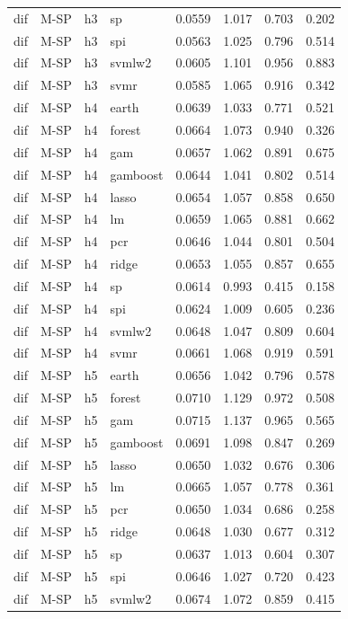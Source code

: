 \begin{ThreePartTable}
\begin{longtable}[t]{llclcccc}
dif & M-SP & h3 & sp & 0.0559 & 1.017 & 0.703 & 0.202\\
dif & M-SP & h3 & spi & 0.0563 & 1.025 & 0.796 & 0.514\\
dif & M-SP & h3 & svmlw2 & 0.0605 & 1.101 & 0.956 & 0.883\\
dif & M-SP & h3 & svmr & 0.0585 & 1.065 & 0.916 & 0.342\\
\addlinespace
dif & M-SP & h4 & earth & 0.0639 & 1.033 & 0.771 & 0.521\\
dif & M-SP & h4 & forest & 0.0664 & 1.073 & 0.940 & 0.326\\
dif & M-SP & h4 & gam & 0.0657 & 1.062 & 0.891 & 0.675\\
dif & M-SP & h4 & gamboost & 0.0644 & 1.041 & 0.802 & 0.514\\
dif & M-SP & h4 & lasso & 0.0654 & 1.057 & 0.858 & 0.650\\
dif & M-SP & h4 & lm & 0.0659 & 1.065 & 0.881 & 0.662\\
dif & M-SP & h4 & pcr & 0.0646 & 1.044 & 0.801 & 0.504\\
dif & M-SP & h4 & ridge & 0.0653 & 1.055 & 0.857 & 0.655\\
dif & M-SP & h4 & sp & 0.0614 & 0.993 & 0.415 & 0.158\\
dif & M-SP & h4 & spi & 0.0624 & 1.009 & 0.605 & 0.236\\
dif & M-SP & h4 & svmlw2 & 0.0648 & 1.047 & 0.809 & 0.604\\
dif & M-SP & h4 & svmr & 0.0661 & 1.068 & 0.919 & 0.591\\
\addlinespace
dif & M-SP & h5 & earth & 0.0656 & 1.042 & 0.796 & 0.578\\
dif & M-SP & h5 & forest & 0.0710 & 1.129 & 0.972 & 0.508\\
dif & M-SP & h5 & gam & 0.0715 & 1.137 & 0.965 & 0.565\\
dif & M-SP & h5 & gamboost & 0.0691 & 1.098 & 0.847 & 0.269\\
dif & M-SP & h5 & lasso & 0.0650 & 1.032 & 0.676 & 0.306\\
dif & M-SP & h5 & lm & 0.0665 & 1.057 & 0.778 & 0.361\\
dif & M-SP & h5 & pcr & 0.0650 & 1.034 & 0.686 & 0.258\\
dif & M-SP & h5 & ridge & 0.0648 & 1.030 & 0.677 & 0.312\\
dif & M-SP & h5 & sp & 0.0637 & 1.013 & 0.604 & 0.307\\
dif & M-SP & h5 & spi & 0.0646 & 1.027 & 0.720 & 0.423\\
dif & M-SP & h5 & svmlw2 & 0.0674 & 1.072 & 0.859 & 0.415\\

\end{longtable}
\end{ThreePartTable}
